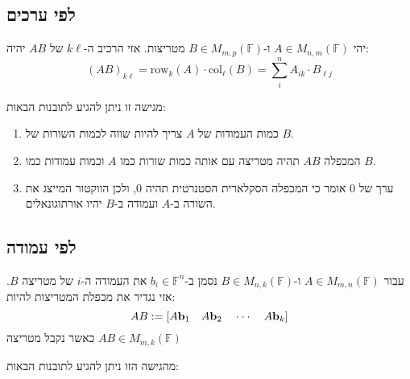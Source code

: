 \documentclass{tstextbook}
\begin{document}
\subsection{לפי ערכים}

\begin{definition}
יהי \(A \in M_{n,m}\left( \mathbb{F}  \right)\) ו-\(B\in M_{m,p}\left( \mathbb{F}  \right)\) מטריצות. אזי הרכיב ה-\(k\ell\) של \(AB\) יהיה:
$$(AB)_{k\ell}=\mathrm{row}_{k}(A)\cdot \mathrm{col}_{\ell}(B)=\sum_{i}^{n} A_{ik}\cdot B_{\ell j}$$

\end{definition}
מגישה זו ניתן להגיע לתובנות הבאות:

\begin{enumerate}
  \item כמות העמודות של \(A\) צריך להיות שווה לכמות השורות של \(B\). 


  \item המכפלה \(AB\) תהיה מטריצה עם אותה כמות שורות כמו \(A\) וכמות עמודות כמו \(B\). 


  \item ערך של 0 אומר כי המכפלה הסקלארית הסטנרטית תהיה 0, ולכן הווקטור המייצג את השורה ב-\(A\) ועמודה ב-\(B\) יהיו אורתוגונאלים. 


\end{enumerate}
\subsection{לפי עמודה}

\begin{definition}
עבור \(A \in M_{m,n}\left( \mathbb{F}  \right)\) ו-\(B \in M_{n,k}\left( \mathbb{F}  \right)\) נסמן ב-\(b_{i}\in \mathbb{F} ^{n}\) את העמודה ה-\(i\) של מטריצה \(B\). אזי נגדיר את מכפלת המטריצות להיות:
$$A B:=\left[A{\bf b}_{1}\quad A{\bf b}_{2}\quad\cdot\cdot\cdot\quad A{\bf b}_{k}\right]$$
כאשר נקבל מטריצה \(AB \in M_{m,k}\left( \mathbb{F}  \right)\)

\end{definition}
מהגישה הזו ניתן להגיע לתובנות הבאות:
\end{document}
